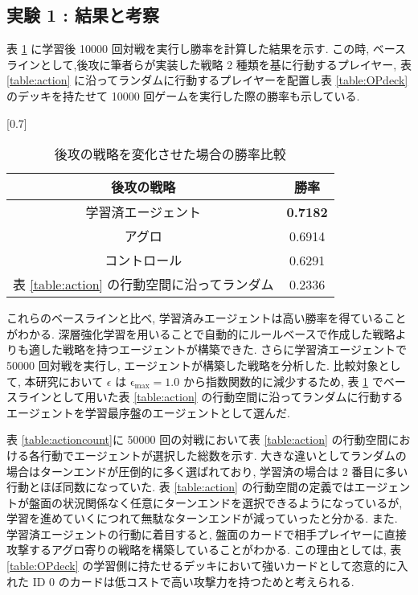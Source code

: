 \documentclass[twocolumn]{jarticle}
\begin{document}
     \subsection{実験 1 : 結果と考察}
     表 \ref{table:winratejikken1} に学習後 10000 回対戦を実行し勝率を計算した結果を示す. この時, ベースラインとして,後攻に筆者らが実装した戦略 2 種類を基に行動するプレイヤー, 表 \ref{table:action} に沿ってランダムに行動するプレイヤーを配置し表 \ref{table:OPdeck} のデッキを持たせて 10000 回ゲームを実行した際の勝率も示している. 
     \begin{table}[t]
       \centering
       \caption{後攻の戦略を変化させた場合の勝率比較}
       \vspace{-0.3cm}
       \label{table:winratejikken1}
       \scalebox{0.7}[0.7]{
         \begin{tabular}{|c|c|}
            \hline
            後攻の戦略        & 勝率     \\ \hline \hline
            学習済エージェント    & \textbf{0.7182} \\ \hline
            アグロ          & 0.6914 \\ \hline
            コントロール       & 0.6291 \\ \hline
            表 \ref{table:action} の行動空間に沿ってランダム & 0.2336       \\ \hline
            \end{tabular}
       }
       \end{table}
       これらのベースラインと比べ, 学習済みエージェントは高い勝率を得ていることがわかる. 深層強化学習を用いることで自動的にルールベースで作成した戦略よりも適した戦略を持つエージェントが構築できた.
       さらに学習済エージェントで 50000 回対戦を実行し, エージェントが構築した戦略を分析した.
       比較対象として, 本研究において $\epsilon$ は $\mathrm{\epsilon_{max}} = 1.0$ から指数関数的に減少するため, 表 \ref{table:winratejikken1} でベースラインとして用いた表 \ref{table:action} の行動空間に沿ってランダムに行動するエージェントを学習最序盤のエージェントとして選んだ.\par 
       表 \ref{table:actioncount}に 50000 回の対戦において表 \ref{table:action} の行動空間における各行動でエージェントが選択した総数を示す. 大きな違いとしてランダムの場合はターンエンドが圧倒的に多く選ばれており, 学習済の場合は 2 番目に多い行動とほぼ同数になっていた. 表 \ref{table:action} の行動空間の定義ではエージェントが盤面の状況関係なく任意にターンエンドを選択できるようになっているが, 学習を進めていくにつれて無駄なターンエンドが減っていったと分かる.
       また. 学習済エージェントの行動に着目すると, 盤面のカードで相手プレイヤーに直接攻撃するアグロ寄りの戦略を構築していることがわかる. この理由としては, 表 \ref{table:OPdeck} の学習側に持たせるデッキにおいて強いカードとして恣意的に入れた ID 0 のカードは低コストで高い攻撃力を持つためと考えられる. \par
\end{document}
